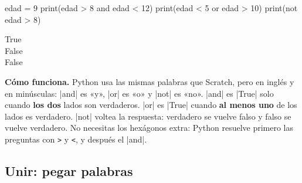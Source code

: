 \begin{tcbraster}[raster columns=2, raster equal height=rows, raster column skip=12pt, raster valign=center, raster force size=false, raster odd column/.style={add to width=-1.2cm}, raster even column/.style={add to width=1.2cm}]
\begin{tcolorbox}[colback=white, colframe=white, boxrule=0pt, valign=center]
\begin{scratch}[scale=0.74]
\end{scratch}
\end{tcolorbox}
\begin{tcolorbox}[colback=white, colframe=white, boxrule=0pt, left=0pt, right=0pt, top=0pt, bottom=0pt, valign=center]
\begin{code}
edad = 9
print(edad > 8 and edad < 12)
print(edad < 5 or edad > 10)
print(not edad > 8)
\end{code}
\begin{outputbox}
True\\
False\\
False
\end{outputbox}
\end{tcolorbox}
\end{tcbraster}

\textbf{Cómo funciona.} Python usa las mismas palabras que Scratch, pero en inglés y en minúsculas: \py|and| es «y», \py|or| es «o» y \py|not| es «no». \py|and| es \py|True| solo cuando \textbf{los dos} lados son verdaderos. \py|or| es \py|True| cuando \textbf{al menos uno} de los lados es verdadero. \py|not| voltea la respuesta: verdadero se vuelve falso y falso se vuelve verdadero. No necesitas los hexágonos extra: Python resuelve primero las preguntas con \texttt{>} y \texttt{<}, y después el \py|and|.

\subsection*{Unir: pegar palabras}

